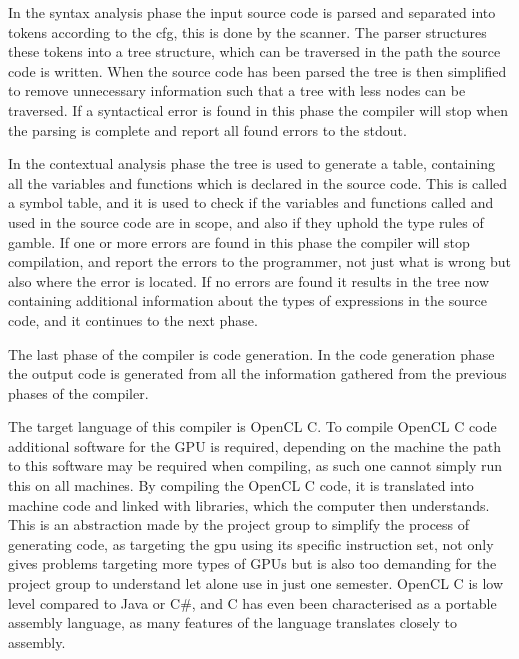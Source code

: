 In the syntax analysis phase the input source code is parsed and separated into tokens according to the \acrshort{cfg}, this is done by the scanner. 
The parser structures these tokens into a tree structure, which can be traversed in the path the source code is written.
When the source code has been parsed the tree is then simplified to remove unnecessary information such that a tree with less nodes can be traversed.
If a syntactical error is found in this phase the compiler will stop when the parsing is complete and report all found errors to the stdout.

In the contextual analysis phase the tree is used to generate a table, containing all the variables and functions which is declared in the source code.
This is called a symbol table, and it is used to check if the variables and functions called and used in the source code are in scope, and also if they uphold the type rules of \gls{gamble}.
If one or more errors are found in this phase the compiler will stop compilation, and report the errors to the programmer, not just what is wrong but also where the error is located.
If no errors are found it results in the tree now containing additional information about the types of expressions in the source code, and it continues to the next phase.

The last phase of the compiler is code generation.
In the code generation phase the output code is generated from all the information gathered from the previous phases of the compiler.

The target language of this compiler is OpenCL C.
To compile OpenCL C code additional software for the GPU is required, depending on the machine the path to this software may be required when compiling, as such one cannot simply run this on all machines.
By compiling the OpenCL C code, it is translated into machine code and linked with libraries, which the computer then understands.
This is an abstraction made by the project group to simplify the process of generating code, as targeting the \acrshort{gpu} using its specific instruction set, not only gives problems targeting more types of GPUs but is also too demanding for the project group to understand let alone use in just one semester.
OpenCL C is low level compared to Java or C\#, and C has even been characterised as a portable assembly language, as many features of the language translates closely to assembly. \citep{CPort}

